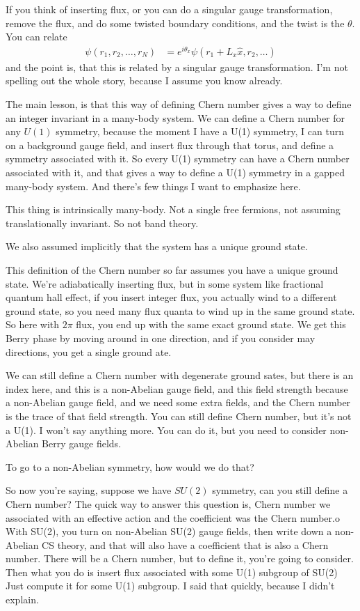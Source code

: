 If you think of inserting flux,
or you can do a singular gauge transformation,
remove the flux,
and do some twisted boundary conditions,
and the twist is the $\theta$.
You can relate
\begin{align}
    \psi\left( r_1, r_2, \ldots, r_N \right) &=
    e^{i\theta_x}\psi\left( r_1 + L_x \hat{x}, r_2,\ldots \right)
\end{align}
and the point is,
that this is related by a singular gauge transformation.
I'm not spelling out the whole story, because I assume you know already.

The main lesson,
is that this way of defining Chern number
gives a way to define an integer invariant in a many-body system.
We can define a Chern number for any $U(1)$ symmetry,
because the moment I have a U(1) symmetry,
I can turn on a background gauge field,
and insert flux through that torus,
and define a symmetry associated with it.
So every U(1) symmetry can have a  Chern number associated with it,
and that gives a way to define a U(1) symmetry in a gapped many-body system.
And there's few things I want to emphasize here.

This thing is intrinsically many-body.
Not a single free fermions,
not assuming translationally invariant.
So not band theory.

We also assumed implicitly that the system has a unique ground state.

This definition of the Chern number so far assumes you have a unique ground
state.
We're adiabatically inserting flux,
but in some system like fractional quantum hall effect,
if you insert integer flux,
you actually wind to a different ground state,
so you need many flux quanta to wind up in the same ground state.
So here with $2\pi$ flux,
you end up with the same exact ground state.
We get this Berry phase by moving around in one direction,
and if you consider may directions,
you get a single ground ate.

We can still define a Chern number with degenerate ground sates,
but there is an index here,
and this is a non-Abelian gauge field,
and this field strength because a non-Abelian gauge field,
and we need some extra fields,
and the Chern number is the trace of that field strength.
You can still define Chern number,
but it's not a U(1).
I won't say anything more.
You can do it,
but you need to consider non-Abelian Berry gauge fields.

\begin{question}
    To go to a non-Abelian symmetry,
    how would we do that?
\end{question}
So now you're saying,
suppose we have $SU(2)$ symmetry,
can you still define a Chern number?
The quick way to answer this question is,
Chern number we associated with an effective action
and the coefficient was the Chern number.o
With SU(2),
you turn on non-Abelian SU(2) gauge fields,
then write down a non-Abelian CS theory,
and that will also have a coefficient that is also a Chern number.
There will be a Chern number,
but to define it,
you're going to consider.
Then what you do is insert flux associated with some U(1) subgroup of
SU(2)
Just compute it for some U(1) subgroup.
I said that quickly,
because I didn't explain.

